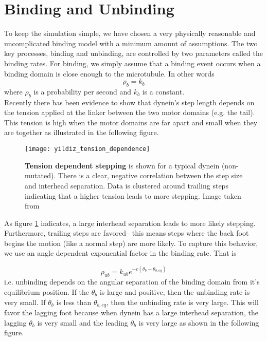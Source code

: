 	\section{Binding and Unbinding}
	To keep the simulation simple, we have chosen a very physically reasonable and uncomplicated binding model with a minimum amount of assumptions. The two key processes, binding and unbinding, are controlled by two parameters called the binding rates. For binding, we simply assume that a binding event occurs when a binding domain is close enough to the microtubule. In other words
	\begin{equation}
		\rho_{b} = k_b
	\end{equation}
	where $\rho_b$ is a probability per second and $k_b$ is a constant. \\
	
	Recently there has been evidence to show that dynein's step length depends on the tension applied at the linker between the two motor domains (e.g. the tail).\cite{cleary2014tension} This tension is high when the motor domains are far apart and small when they are together as illustrated in the following figure. \\
	\begin{figure}[!hbt]
		\centering
		\texttt{[image: yildiz\_tension\_dependence]}
		\caption{\textbf{Tension dependent stepping} is shown for a typical dynein (non-mutated). There is a clear, negative correlation between the step size and interhead separation. Data is clustered around trailing steps indicating that a higher tension leads to more stepping. Image taken from \cite{cleary2014tension}}
		\label{fig:yildiz_tension}
	\end{figure} 	
	As figure \ref{fig:yildiz_tension} indicates, a large interhead separation leads to more likely stepping. Furthermore, trailing steps are favored-- this means steps where the back foot begins the motion (like a normal step) are more likely. To capture this behavior, we use an angle dependent exponential factor in the binding rate. That is 
	
	
	
	\begin{equation}
	\rho_{ub} = k_{ub}e^{-c(\theta_b-\theta_{b,eq})}
	\end{equation}
	i.e. unbinding depends on the angular separation of the binding domain from it's equilibrium position. If the $\theta_b$ is large and positive, then the unbinding rate is very small. If $\theta_b$ is less than $\theta_{b,eq}$, then the unbinding rate is very large. This will favor the lagging foot because when dynein has a large interhead separation, the lagging $\theta_b$ is very small and the leading $\theta_b$ is very large as shown in the following figure. 
	
